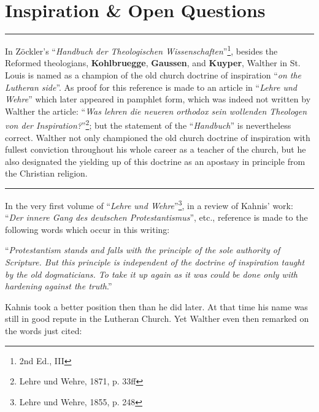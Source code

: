 \chapter{Inspiration \& Open Questions}

\hrule
\vspace{.30cm}
In Zöckler’s ``\textit{Handbuch der Theologischen Wissenschaften}”\footnote{2nd Ed., III}, besides the Reformed theologians, \textbf{Kohlbruegge}, \textbf{Gaussen}, and \textbf{Kuyper}, Walther in St. Louis is named as a champion of the old church doctrine of inspiration  ``\textit{on the Lutheran side}”.  As proof for this reference is made to an article in ``\textit{Lehre und Wehre}” which later appeared in pamphlet form, which was indeed not written by Walther the article: ``\textit{Was lehren die neueren orthodox sein wollenden Theologen von der Inspiration?}”\footnote{Lehre und Wehre, 1871, p. 33ff}; but the statement of the ``\textit{Handbuch}” is nevertheless correct.  Walther not only championed the old church doctrine of inspiration with fullest conviction throughout his whole career as a teacher of the church, but he also designated the yielding up of this doctrine as an apostasy in principle from the Christian religion.
\vspace{.10cm}
\hrule
\vspace{1.25cm}

In the very first volume of ``\textit{Lehre und Wehre}''\footnote{Lehre und Wehre, 1855, p. 248}, in a review of Kahnis’ work: ``\textit{Der innere Gang des deutschen Protestantismus}'', etc., reference is made to the following words which occur in this writing:

\begin{displayquote}``\textit{Protestantism stands and falls with the principle of the sole authority of Scripture.  But this principle is independent of the doctrine of inspiration taught by the old dogmaticians.  To take it up again as it was could be done only with hardening against the truth}.''\end{displayquote} Kahnis took a better position then than he did later.  At that time his name was still in good repute in the Lutheran Church.  Yet Walther even then remarked on the words just cited:

